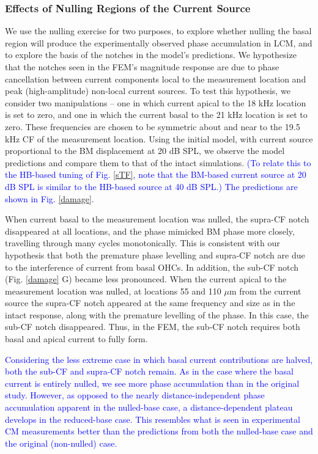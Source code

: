 \documentclass{biophys-new}
\begin{document}
\subsubsection{Effects of Nulling Regions of the Current Source}
\par{We use the nulling exercise for two purposes, to explore whether nulling the basal region will produce the experimentally observed phase accumulation in LCM, and to explore the basis of the notches in the model's predictions.  We hypothesize that the notches seen in the FEM's magnitude response are due to phase cancellation between current components local to the measurement location and peak (high-amplitude) non-local current sources. To test this hypothesis, we consider two manipulations -- one in which current apical to the 18 kHz location is set to zero, and one in which the current basal to the 21 kHz location is set to zero. These frequencies are chosen to be symmetric about and near to the 19.5 kHz CF of the measurement location. Using the initial model, with current source proportional to the BM displacement at 20 dB SPL, we observe the model predictions and compare them to that of the intact simulations. \textcolor{blue}{(To relate this to the HB-based tuning of Fig. \ref{sTF}, note that the BM-based current source at 20 dB SPL is similar to the HB-based source at 40 dB SPL.) The predictions are shown in Fig. \ref{damage}.}}
\par{When current basal to the measurement location was nulled, the supra-CF notch disappeared at all locations, and the phase mimicked BM phase more closely, travelling through many cycles monotonically. This is consistent with our hypothesis that both the premature phase levelling and supra-CF notch are due to the interference of current from basal OHCs. In addition, the sub-CF notch (Fig. \ref{damage} G) became less pronounced. When the current apical to the measurement location was nulled, at locations 55 and 110 $\mu$m from the current source the supra-CF notch appeared at the same frequency and size as in the intact response, along with the premature levelling of the phase. In this case, the sub-CF notch disappeared.  Thus, in the FEM, the sub-CF notch requires both basal and apical current to fully form.}
\par{\textcolor{blue}{Considering the less extreme case in which basal current contributions are halved, both the sub-CF and supra-CF notch remain. As in the case where the basal current is entirely nulled, we see more phase accumulation than in the original study. However, as opposed to the nearly distance-independent phase accumulation apparent in the nulled-base case, a distance-dependent plateau develops in the reduced-base case. This resembles what is seen in experimental CM measurements better than the predictions from both the nulled-base case and the original (non-nulled) case.}}
\end{document}
